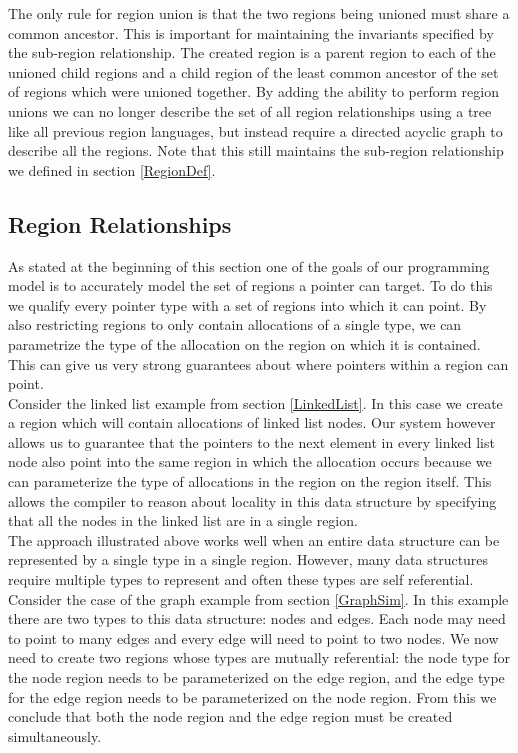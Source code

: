\documentclass{article}
\theoremstyle{definition}
\begin{document}
\noindent
The only rule for region union is that the two regions being unioned must share
a common ancestor.  This is important for maintaining the invariants specified
by the sub-region relationship.  The created region is a parent region to
each of the unioned child regions and a child region of the least common ancestor
of the set of regions which were unioned together.  By adding the ability to perform region
unions we can no longer describe the set of all region relationships using a tree
like all previous region languages, but instead require a directed acyclic graph
to describe all the regions.  Note that this still maintains the sub-region
relationship we defined in section \ref {RegionDef}.

\subsection{Region Relationships \label{RegionRelationship}}
\noindent
As stated at the beginning of this section one of the goals of our programming model
is to accurately model the set of regions a pointer can target.  To do this we
qualify every pointer type with a set of regions into which it can point.  By also
restricting regions to only contain allocations of a single type, we can parametrize
the type of the allocation on the region on which it is contained.  This can give us
very strong guarantees about where pointers within a region can point.\\

\noindent 
Consider the linked list example from section \ref{LinkedList}.  In this case we create
a region which will contain allocations of linked list nodes.  Our system however allows
us to guarantee that the pointers to the next element in every linked list
node also point into the same region in which the allocation occurs because we can
parameterize the type of allocations in the region on the region itself.  This allows
the compiler to reason about locality in this data structure by specifying that all
the nodes in the linked list are in a single region.\\

\noindent
The approach illustrated above works well when an entire data structure can be
represented by a single type in a single region.  However, many data structures require
multiple types to represent and often these types are self referential.  Consider
the case of the graph example from section \ref{GraphSim}.  In this example there
are two types to this data structure: nodes and edges.  Each node may need to point
to many edges and every edge will need to point to two nodes.  We now need to create
two regions whose types are mutually referential: the node type for the node region
needs to be parameterized on the edge region, and the edge type for the edge region
needs to be parameterized on the node region.  From this we conclude that both the
node region and the edge region must be created simultaneously.\\
\end{document}
